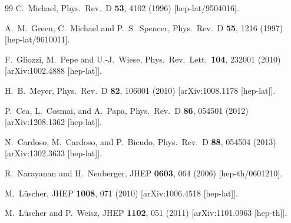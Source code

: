 \documentclass[3p,twocolumn,sort&compress]{elsarticle}
\begin{document}
\begin{thebibliography}{99}
  C.~Michael,
  Phys.\ Rev.\ D {\bf 53}, 4102 (1996)
  [hep-lat/9504016].
  
  
  A.~M.~Green, C.~Michael and P.~S.~Spencer,
  Phys.\ Rev.\ D {\bf 55}, 1216 (1997)
  [hep-lat/9610011].
  
  F.~Gliozzi, M.~Pepe and U.-J.~Wiese,
  Phys.\ Rev.\ Lett.\  {\bf 104}, 232001 (2010)
  [arXiv:1002.4888 [hep-lat]].
  
  H.~B.~Meyer,
  Phys.\ Rev.\ D {\bf 82}, 106001 (2010)
  [arXiv:1008.1178 [hep-lat]].


  P.~Cea, L.~Cosmai, and A.~Papa,
  Phys.\ Rev.\ D {\bf 86}, 054501 (2012)
  [arXiv:1208.1362 [hep-lat]].
	
  N.~Cardoso, M.~Cardoso, and P.~Bicudo,
  Phys.\ Rev.\ D {\bf 88}, 054504 (2013)
  [arXiv:1302.3633 [hep-lat]].



  R.~Narayanan and H.~Neuberger,
  JHEP {\bf 0603}, 064 (2006)
  [hep-th/0601210].

  M.~L\"uscher,
  JHEP {\bf 1008}, 071 (2010)
  [arXiv:1006.4518 [hep-lat]].

  M.~L\"uscher and P.~Weisz,
  JHEP {\bf 1102}, 051 (2011)
  [arXiv:1101.0963 [hep-th]].



\end{thebibliography}
\end{document}

